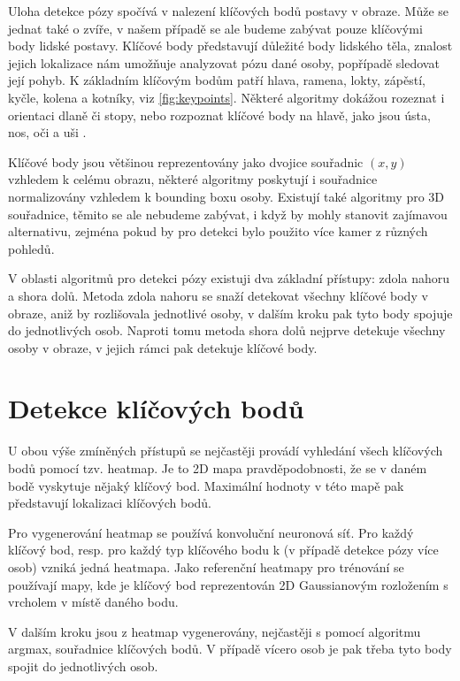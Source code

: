 Uloha detekce pózy spočívá v nalezení klíčových bodů postavy v obraze. Může se
jednat také o zvíře, v našem případě se ale budeme zabývat pouze klíčovými body
lidské postavy. Klíčové body představují důležité body lidského těla, znalost
jejich lokalizace nám umožňuje analyzovat pózu dané osoby, popřípadě sledovat
její pohyb. K základním klíčovým bodům patří hlava, ramena, lokty, zápěstí,
kyčle, kolena a kotníky, viz \ref{fig:keypoints}. Některé algoritmy dokážou
rozeznat i orientaci dlaně či stopy, nebo rozpoznat klíčové body na hlavě, jako
jsou ústa, nos, oči a uši \cite{blazepose}.

Klíčové body jsou většinou reprezentovány jako dvojice souřadnic $(x, y)$
vzhledem k celému obrazu, některé algoritmy poskytují i souřadnice
normalizovány vzhledem k bounding boxu osoby. Existují také algoritmy pro 3D
souřadnice, těmito se ale nebudeme zabývat, i když by mohly stanovit zajímavou
alternativu, zejména pokud by pro detekci bylo použito více kamer z různých
pohledů.

V oblasti algoritmů pro detekci pózy existuji dva základní přístupy: zdola
nahoru a shora dolů. Metoda zdola nahoru se snaží detekovat všechny klíčové
body v obraze, aniž by rozlišovala jednotlivé osoby, v dalším kroku pak tyto
body spojuje do jednotlivých osob. Naproti tomu metoda shora dolů nejprve
detekuje všechny osoby v obraze, v jejich rámci pak detekuje klíčové body.

\section{Detekce klíčových bodů}

U obou výše zmíněných přístupů se nejčastěji provádí vyhledání všech klíčových
bodů pomocí tzv. heatmap. Je to 2D mapa pravděpodobnosti, že se v daném bodě
vyskytuje nějaký klíčový bod. Maximální hodnoty v této mapě pak představují
lokalizaci klíčových bodů.

Pro vygenerování heatmap se používá konvoluční neuronová síť. Pro každý klíčový
bod, resp. pro každý typ klíčového bodu k (v případě detekce pózy více osob)
vzniká jedná heatmapa. Jako referenční heatmapy pro trénování se používají
mapy, kde je klíčový bod reprezentován 2D Gaussianovým rozložením s vrcholem v
místě daného bodu.

V dalším kroku jsou z heatmap vygenerovány, nejčastěji s pomocí algoritmu
argmax, souřadnice klíčových bodů. V případě vícero osob je pak třeba tyto body
spojit do jednotlivých osob.

